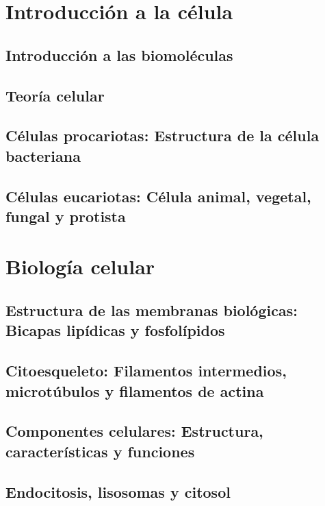 \documentclass{../summarie}
\begin{document}
\Portada
\Indice
\fancystyle
\onehalfspacing


\part{Introducción a la célula}
    \chapter{Introducción a las biomoléculas}
        
        
    \chapter{Teoría celular}
        
        
    \chapter{Células procariotas: Estructura de la célula bacteriana}
    \chapter{Células eucariotas: Célula animal, vegetal, fungal y protista}

\part{Biología celular}
    \chapter{Estructura de las membranas biológicas: Bicapas lipídicas y fosfolípidos}
        
        
    \chapter{Citoesqueleto: Filamentos intermedios, microtúbulos y filamentos de actina}
    \chapter{Componentes celulares: Estructura, características y funciones}
    \chapter{Endocitosis, lisosomas y citosol}
\end{document}
